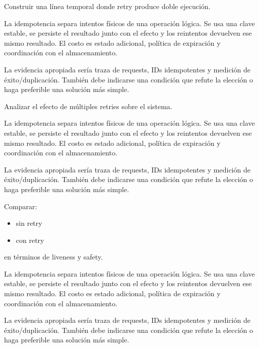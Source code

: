 \documentclass[variant=guia,cover=institutional,mode=screen]{ua-engineering-v6-article}
\begin{document}
\begin{uaexercise}
Construir una línea temporal donde retry produce doble ejecución.
\end{uaexercise}
\begin{uaanswer}
La idempotencia separa intentos físicos de una operación lógica. Se usa una clave estable, se persiste el resultado junto con el efecto y los reintentos devuelven ese mismo resultado. El costo es estado adicional, política de expiración y coordinación con el almacenamiento.

La evidencia apropiada sería traza de requests, IDs idempotentes y medición de éxito/duplicación. También debe indicarse una condición que refute la elección o haga preferible una solución más simple.
\end{uaanswer}

\begin{uaexercise}
Analizar el efecto de múltiples retries sobre el sistema.
\end{uaexercise}
\begin{uaanswer}
La idempotencia separa intentos físicos de una operación lógica. Se usa una clave estable, se persiste el resultado junto con el efecto y los reintentos devuelven ese mismo resultado. El costo es estado adicional, política de expiración y coordinación con el almacenamiento.

La evidencia apropiada sería traza de requests, IDs idempotentes y medición de éxito/duplicación. También debe indicarse una condición que refute la elección o haga preferible una solución más simple.
\end{uaanswer}

\begin{uaexercise}
Comparar:
\begin{itemize}
\item sin retry
\item con retry
\end{itemize}
en términos de liveness y safety.
\end{uaexercise}
\begin{uaanswer}
La idempotencia separa intentos físicos de una operación lógica. Se usa una clave estable, se persiste el resultado junto con el efecto y los reintentos devuelven ese mismo resultado. El costo es estado adicional, política de expiración y coordinación con el almacenamiento.

La evidencia apropiada sería traza de requests, IDs idempotentes y medición de éxito/duplicación. También debe indicarse una condición que refute la elección o haga preferible una solución más simple.
\end{uaanswer}
\end{document}
